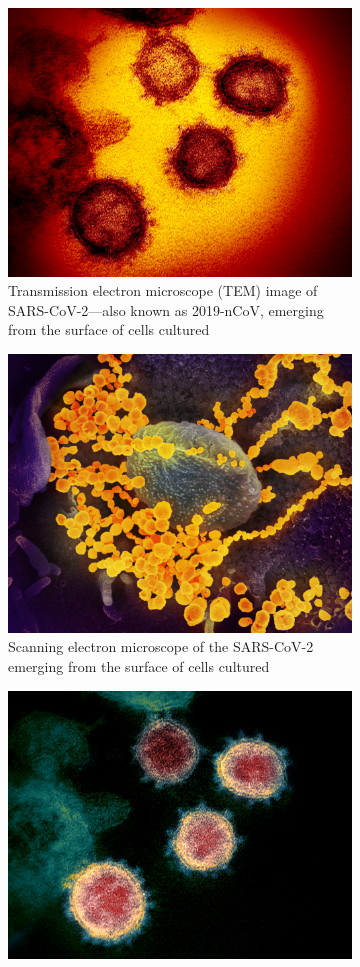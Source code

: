 \documentclass[
12pt, %
a4paper, %
oneside, %
headinclude,footinclude, %
BCOR5mm, %
]{scrartcl}
\begin{document}
\begin{figure}[ht]
\begin{subfigure}{.5\textwidth}
  \centering
  \includegraphics[width=.7\linewidth]{Figures/Coronavirus1.jpg}
  \caption{Transmission electron microscope (TEM) image of SARS-CoV-2—also known as 2019-nCoV, emerging from the surface of cells cultured}
  \label{fig:sub-first}
\end{subfigure}
\begin{subfigure}{.5\textwidth}
  \centering
  \includegraphics[width=.7\linewidth]{Figures/Coronavirus2.jpg} 
  \caption{Scanning electron microscope of the SARS-CoV-2 emerging from the surface of cells cultured}
  \label{fig:sub-second}
\end{subfigure}
\begin{subfigure}{.5\textwidth}
  \centering
  \includegraphics[width=.7\linewidth]{Figures/Coronavirus3.jpg} 

\end{subfigure}
\end{figure}
\end{document}
